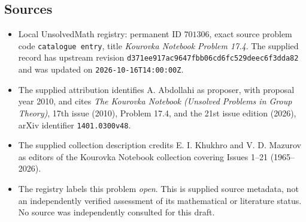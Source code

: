 \documentclass[11pt]{article}
\begin{document}
\subsection{Sources}
\begin{itemize}
\item Local UnsolvedMath registry: permanent ID \(701306\), exact source problem code \texttt{catalogue entry}, title \emph{Kourovka Notebook Problem 17.4}. The supplied record has upstream revision \texttt{d371ee917ac9647fbb06cd6fc529deec6f3dda82} and was updated on \texttt{2026-10-16T14:00:00Z}.
\item The supplied attribution identifies A. Abdollahi as proposer, with proposal year 2010, and cites \emph{The Kourovka Notebook (Unsolved Problems in Group Theory)}, 17th issue (2010), Problem 17.4, and the 21st issue edition (2026), arXiv identifier \texttt{1401.0300v48}.
\item The supplied collection description credits E. I. Khukhro and V. D. Mazurov as editors of the Kourovka Notebook collection covering Issues 1--21 (1965--2026).
\item The registry labels this problem \emph{open}. This is supplied source metadata, not an independently verified assessment of its mathematical or literature status. No source was independently consulted for this draft.
\end{itemize}
\end{document}
